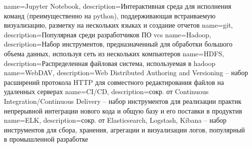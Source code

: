 {
    name=Jupyter Notebook,
    description={Интерактивная среда для исполнения команд (преимущественно на \gls{python}), поддерживающая встраиваемую визуализацию, разметку на нескольких языках и создание отчетов}
}
{
    name=git,
    description={Популярная среди разработчиков ПО \acrshort{vcs}}
}
{
    name=Hadoop,
    description={Набор инструментов, предназначенный для обработки большого объема данных, используя сеть из нескольких компьютеров}
}
{
    name=HDFS,
    description={Распределенная файловая система, используемая в \gls{hadoop}}
}
{
    name=WebDAV,
    description={Web Distributed Authoring and Versioning -- набор расширений протокола HTTP для совместного редактирования файлов на удаленных серверах}
}
{
    name=CI/CD,
    description={сокр. от Continuous Integration/Continuous Delivery -- набор инструментов для реализации практик непрерывной интеграции нового кода и общую базу и его поставки в продуктив}
}
{
    name=ELK,
    description={сокр. от Elasticsearch, Logstash, Kibana -- набор инструментов для сбора, хранения, агрегации и визуализации логов, популярный в промышленной разработке}
}
